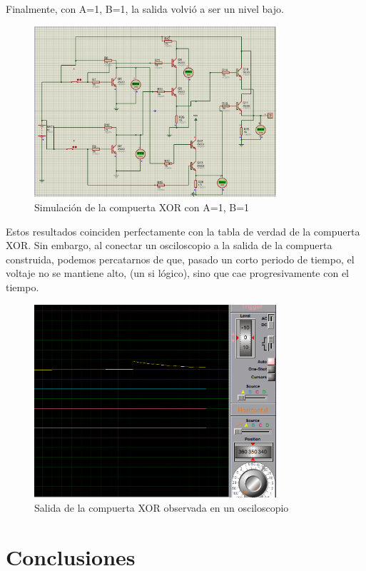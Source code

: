 \documentclass{article}
\begin{document}
Finalmente, con A=1, B=1, la salida volvió a ser un nivel bajo.
\begin{figure}[H]
\centering
\includegraphics[width=0.8\textwidth]{IMG/11.png}
\caption{Simulación de la compuerta XOR con A=1, B=1}
\label{fig:simulacion_a1b1}
\end{figure}
Estos resultados coinciden perfectamente con la tabla de verdad de la compuerta XOR.
Sin embargo, al conectar un osciloscopio a la salida de la compuerta construida, podemos percatarnos de que, pasado un corto periodo de tiempo, el voltaje no se mantiene alto, (un si lógico), sino que cae progresivamente con el tiempo.
\begin{figure}[H]
\centering
\includegraphics[width=0.8\textwidth]{IMG/Osciloscopio.png}
\caption{Salida de la compuerta XOR observada en un osciloscopio}
\label{fig:osciloscopio}
\end{figure}

\section{Conclusiones}
\label{sec:conclusiones}
\end{document}
